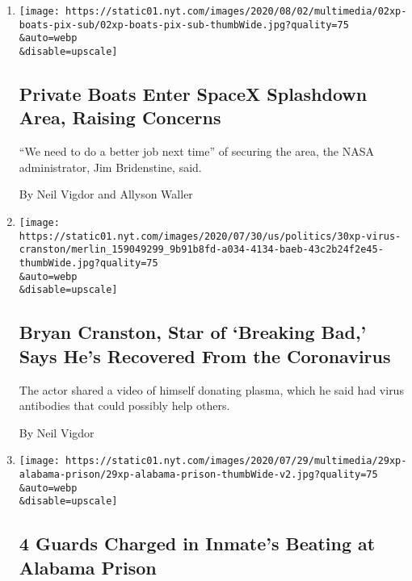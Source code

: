 \begin{enumerate}
\def\labelenumi{\arabic{enumi}.}
\item
  \href{/2020/08/02/us/flag-boat-SpaceX.html}{}

  \texttt{[image: https://static01.nyt.com/images/2020/08/02/multimedia/02xp-boats-pix-sub/02xp-boats-pix-sub-thumbWide.jpg?quality=75\\\&auto=webp\\\&disable=upscale]}

  \hypertarget{private-boats-enter-spacex-splashdown-area-raising-concerns}{%
  \subsection{Private Boats Enter SpaceX Splashdown Area, Raising
  Concerns}\label{private-boats-enter-spacex-splashdown-area-raising-concerns}}

  ``We need to do a better job next time'' of securing the area, the
  NASA administrator, Jim Bridenstine, said.

  By Neil Vigdor and Allyson Waller
\item
  \href{/2020/07/31/arts/television/bryan-cranston-coronavirus-plasma.html}{}

  \texttt{[image: https://static01.nyt.com/images/2020/07/30/us/politics/30xp-virus-cranston/merlin\_159049299\_9b91b8fd-a034-4134-baeb-43c2b24f2e45-thumbWide.jpg?quality=75\\\&auto=webp\\\&disable=upscale]}

  \hypertarget{bryan-cranston-star-of-breaking-bad-says-hes-recovered-from-the-coronavirus}{%
  \subsection{Bryan Cranston, Star of `Breaking Bad,' Says He's
  Recovered From the
  Coronavirus}\label{bryan-cranston-star-of-breaking-bad-says-hes-recovered-from-the-coronavirus}}

  The actor shared a video of himself donating plasma, which he said had
  virus antibodies that could possibly help others.

  By Neil Vigdor
\item
  \href{/2020/07/30/us/alabama-correction-officers-charged.html}{}

  \texttt{[image: https://static01.nyt.com/images/2020/07/29/multimedia/29xp-alabama-prison/29xp-alabama-prison-thumbWide-v2.jpg?quality=75\\\&auto=webp\\\&disable=upscale]}

  \hypertarget{4-guards-charged-in-inmates-beating-at-alabama-prison}{%
  \subsection{4 Guards Charged in Inmate's Beating at Alabama
  Prison}\label{4-guards-charged-in-inmates-beating-at-alabama-prison}}


\end{enumerate}
